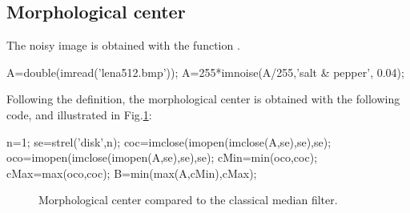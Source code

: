 \def\QRCODE{MASTER_mispa_TUT.IMG.morphological_geodesic_filtering_matlabqrcode.png}
\def\QRPAGE{http://www.iptutorials.science/tree/master/MASTER_mispa/TUT.IMG.morphological_geodesic_filtering/matlab}

\subsection{Morphological center}
The noisy image is obtained with the function .
\begin{matlab}
A=double(imread('lena512.bmp'));
A=255*imnoise(A/255,'salt & pepper', 0.04);
\end{matlab}

Following the definition, the morphological center is obtained with the following code, and illustrated in Fig.\ref{fig:geodesic_filtering:matlab:center}:
\begin{matlab}
n=1;
se=strel('disk',n);
coc=imclose(imopen(imclose(A,se),se),se);
oco=imopen(imclose(imopen(A,se),se),se);
cMin=min(oco,coc);
cMax=max(oco,coc);
B=min(max(A,cMin),cMax);
\end{matlab}

\begin{figure}[htbp]
 \centering
 \hfill
 \hfill
 \caption{Morphological center compared to the classical median filter.}
 \label{fig:geodesic_filtering:matlab:center}
\end{figure}


